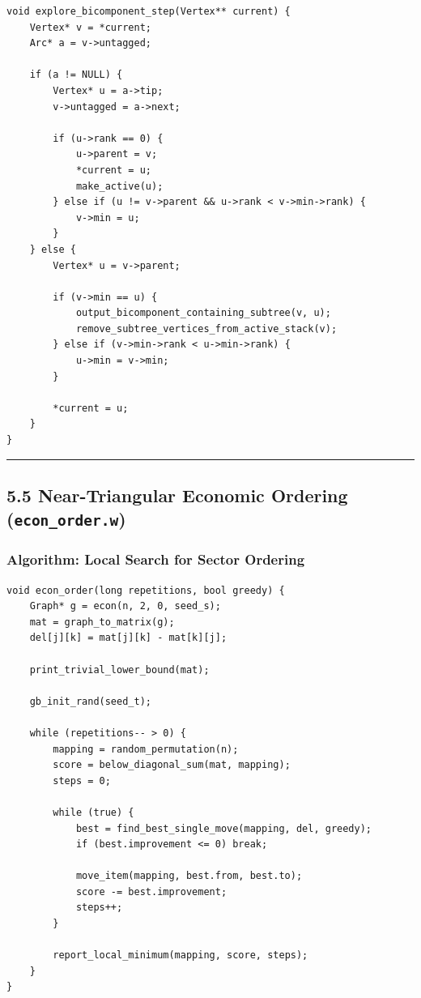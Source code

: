 \documentclass[11pt]{article}
\begin{document}
\begin{verbatim}
void explore_bicomponent_step(Vertex** current) {
    Vertex* v = *current;
    Arc* a = v->untagged;

    if (a != NULL) {
        Vertex* u = a->tip;
        v->untagged = a->next;

        if (u->rank == 0) {
            u->parent = v;
            *current = u;
            make_active(u);
        } else if (u != v->parent && u->rank < v->min->rank) {
            v->min = u;
        }
    } else {
        Vertex* u = v->parent;

        if (v->min == u) {
            output_bicomponent_containing_subtree(v, u);
            remove_subtree_vertices_from_active_stack(v);
        } else if (v->min->rank < u->min->rank) {
            u->min = v->min;
        }

        *current = u;
    }
}
\end{verbatim}

\begin{center}\rule{0.5\linewidth}{0.5pt}\end{center}

\subsection{\texorpdfstring{5.5 Near-Triangular Economic Ordering (\texttt{econ\_order.w})}{5.5 Near-Triangular Economic Ordering (econ\_order.w)}}\label{near-triangular-economic-ordering-econ_order.w}

\subsubsection{Algorithm: Local Search for Sector Ordering}\label{algorithm-local-search-for-sector-ordering}

\begin{verbatim}
void econ_order(long repetitions, bool greedy) {
    Graph* g = econ(n, 2, 0, seed_s);
    mat = graph_to_matrix(g);
    del[j][k] = mat[j][k] - mat[k][j];

    print_trivial_lower_bound(mat);

    gb_init_rand(seed_t);

    while (repetitions-- > 0) {
        mapping = random_permutation(n);
        score = below_diagonal_sum(mat, mapping);
        steps = 0;

        while (true) {
            best = find_best_single_move(mapping, del, greedy);
            if (best.improvement <= 0) break;

            move_item(mapping, best.from, best.to);
            score -= best.improvement;
            steps++;
        }

        report_local_minimum(mapping, score, steps);
    }
}
\end{verbatim}
\end{document}
